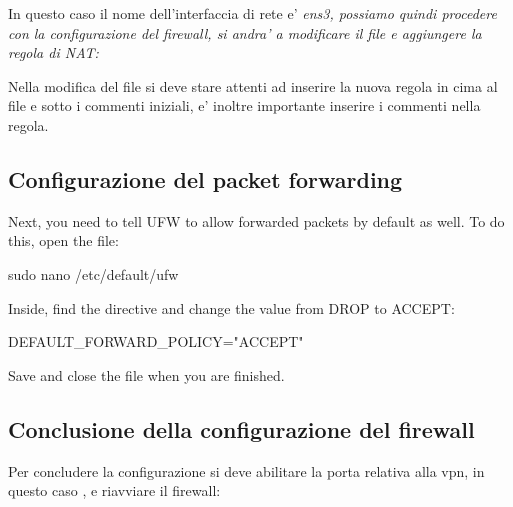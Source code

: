 In questo caso il nome dell'interfaccia di rete e' \it{ens3}, possiamo quindi procedere con la configurazione del firewall, si andra' a modificare il file  e aggiungere la regola di NAT:


Nella modifica del file si deve stare attenti ad inserire la nuova regola in cima al file e sotto i commenti iniziali, e' inoltre importante inserire i commenti nella regola.

\subsection{Configurazione del packet forwarding}

Next, you need to tell UFW to allow forwarded packets by default as well. To do this, open the  file:

\begin{bashcode}
sudo nano /etc/default/ufw
\end{bashcode}

Inside, find the  directive and change the value from DROP to ACCEPT:

\begin{bashcode}
DEFAULT_FORWARD_POLICY="ACCEPT"
\end{bashcode}

Save and close the file when you are finished.

\subsection{Conclusione della configurazione del firewall}

Per concludere la configurazione si deve abilitare la porta relativa alla vpn, in questo caso , e riavviare il firewall:

